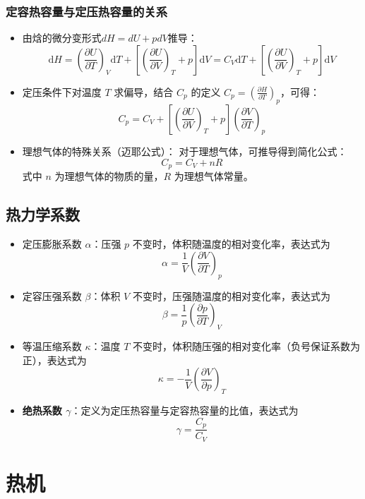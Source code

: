 \documentclass{article}
\begin{document}
	\subsubsection{定容热容量与定压热容量的关系}
	\begin{itemize}[leftmargin=2em, itemsep=0.8em]
		\item 由焓的微分变形式$dH = dU + pdV $推导：
		\[
		\mathrm{d}H=\left(\frac{\partial U}{\partial T}\right)_V\mathrm{d}T+\left[\left(\frac{\partial U}{\partial V}\right)_T + p\right]\mathrm{d}V = C_V\mathrm{d}T+\left[\left(\frac{\partial U}{\partial V}\right)_T + p\right]\mathrm{d}V
		\]
		
		\item 定压条件下对温度 $T$ 求偏导，结合 $C_p$ 的定义 $\displaystyle C_p=\left(\frac{\partial H}{\partial T}\right)_p$，可得：
		\[
		C_p=C_V+\left[\left(\frac{\partial U}{\partial V}\right)_T + p\right]\left(\frac{\partial V}{\partial T}\right)_p
		\]
		
		\item 理想气体的特殊关系（迈耶公式）：
		对于理想气体，可推导得到简化公式：
		\[
		C_p = C_V + nR
		\]
		式中 $n$ 为理想气体的物质的量，$R$ 为理想气体常量。
	\end{itemize}
	
	
	\subsection{热力学系数}
	\begin{itemize}[leftmargin=2em]
		\item 定压膨胀系数 $\alpha$：压强 $p$ 不变时，体积随温度的相对变化率，表达式为
		\[
		\alpha=\frac{1}{V}\left(\frac{\partial V}{\partial T}\right)_p
		\]
		\item 定容压强系数 $\beta$：体积 $V$ 不变时，压强随温度的相对变化率，表达式为
		\[
		\beta=\frac{1}{p}\left(\frac{\partial p}{\partial T}\right)_V
		\]
		\item 等温压缩系数 $\kappa$：温度 $T$ 不变时，体积随压强的相对变化率（负号保证系数为正），表达式为
		\[
		\kappa=-\frac{1}{V}\left(\frac{\partial V}{\partial p}\right)_T
		\]
		\item \textbf{绝热系数 $\gamma$}：定义为定压热容量与定容热容量的比值，表达式为
		\[
		\gamma=\frac{C_p}{C_V}
		\]
	\end{itemize}
	
	
	
	
	
	\section{热机}
	
\end{document}
